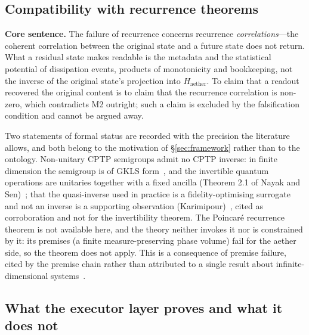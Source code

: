\documentclass[11pt,a4paper]{article}
\newcommand{\Haether}{H_{\mathrm{aether}}}
\begin{document}
\subsection{Compatibility with recurrence theorems}
\label{sec:organs-recurrence}

\textbf{Core sentence.} The failure of recurrence concerns recurrence \emph{correlations}---the coherent correlation between the original state and a future state does not return. What a residual state makes readable is the metadata and the statistical potential of dissipation events, products of monotonicity and bookkeeping, not the inverse of the original state's projection into $\Haether$. To claim that a readout recovered the original content is to claim that the recurrence correlation is non-zero, which contradicts M2 outright; such a claim is excluded by the falsification condition and cannot be argued away.

Two statements of formal status are recorded with the precision the literature allows, and both belong to the motivation of \S\ref{sec:framework} rather than to the ontology. Non-unitary CPTP semigroups admit no CPTP inverse: in finite dimension the semigroup is of GKLS form~\cite{lindblad1976,gorini1976}, and the invertible quantum operations are unitaries together with a fixed ancilla (Theorem 2.1 of Nayak and Sen)~\cite{nayak2007}; that the quasi-inverse used in practice is a fidelity-optimising surrogate and not an inverse is a supporting observation (Karimipour)~\cite{karimipour2020}, cited as corroboration and not for the invertibility theorem. The Poincar\'e recurrence theorem is not available here, and the theory neither invokes it nor is constrained by it: its premises (a finite measure-preserving phase volume) fail for the aether side, so the theorem does not apply. This is a consequence of premise failure, cited by the premise chain rather than attributed to a single result about infinite-dimensional systems~\cite{poincare1890,walters1982,bocchieri1957,wallace2015,caldeira1983}.

\subsection{What the executor layer proves and what it does not}
\label{sec:organs-lean}
\end{document}
